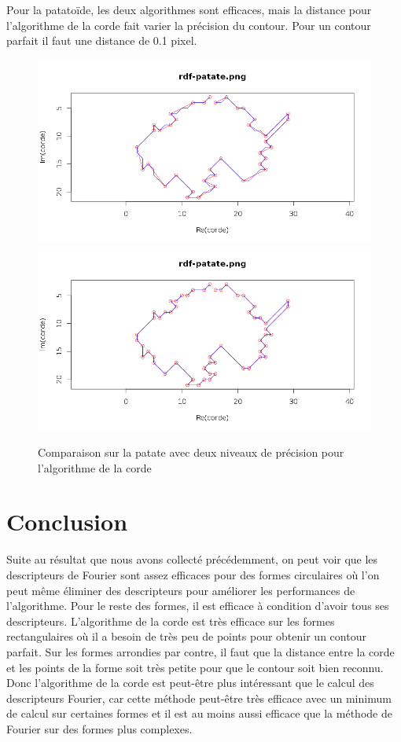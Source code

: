 \documentclass[11pt]{article}
\begin{document}
  \newpage
  
  Pour la patatoïde, les deux algorithmes sont efficaces, mais la distance pour l'algorithme de 
  la corde fait varier la précision du contour. Pour un contour parfait il faut une distance de 0.1 pixel.
  
  \begin{center}
    \begin{figure}[!h]
      \includegraphics[width=15cm]{../resultat/comp_patate_impreci.png}
      \includegraphics[width=15cm]{../resultat/comp_patate_preci.png}
      \caption{Comparaison sur la patate avec deux niveaux de précision pour l'algorithme de la corde}
    \end{figure}
  \end{center}
  
  \newpage
    
  \section{Conclusion}
  Suite au résultat que nous avons collecté précédemment, on peut voir que les descripteurs de Fourier sont assez 
  efficaces pour des formes circulaires où l'on peut même éliminer des descripteurs pour améliorer les performances 
  de l'algorithme. Pour le reste des formes, il est efficace à condition d'avoir tous ses descripteurs. L'algorithme 
  de la corde est très efficace sur les formes rectangulaires où il a besoin de très peu de points pour obtenir un 
  contour parfait. Sur les formes arrondies par contre, il faut que la distance entre la corde et les points de la forme 
  soit très petite pour que le contour soit bien reconnu.\\
  
  Donc l'algorithme de la corde est peut-être plus intéressant que le calcul des descripteurs Fourier, car cette méthode 
  peut-être très efficace avec un minimum de calcul sur certaines formes et il est au moins aussi efficace que la méthode 
  de Fourier sur des formes plus complexes.
  
\end{document}
